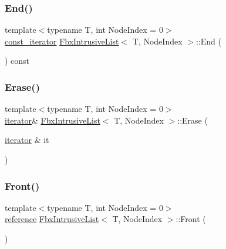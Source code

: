 \mbox{\label{class_fbx_intrusive_list_a0d2ee805c1c4c81b8b2ec06f281bb937}} 
\subsubsection{\texorpdfstring{End()}{End()}\hspace{0.1cm}{\footnotesize\ttfamily [2/2]}}
{\footnotesize\ttfamily template$<$typename T, int Node\+Index = 0$>$ \\
\hyperlink{class_fbx_intrusive_list_a4c0c567c56a712e7ffca9c6bb5990169}{const\+\_\+iterator} \hyperlink{class_fbx_intrusive_list}{Fbx\+Intrusive\+List}$<$ T, Node\+Index $>$\+::End (\begin{DoxyParamCaption}{ }\end{DoxyParamCaption}) const}

\mbox{\label{class_fbx_intrusive_list_a730189544745e9cb520294375d674b5b}} 
\subsubsection{\texorpdfstring{Erase()}{Erase()}}
{\footnotesize\ttfamily template$<$typename T, int Node\+Index = 0$>$ \\
\hyperlink{class_fbx_intrusive_list_ae1012cd86e3ff0a4a49c982f0d34b4e7}{iterator}\& \hyperlink{class_fbx_intrusive_list}{Fbx\+Intrusive\+List}$<$ T, Node\+Index $>$\+::Erase (\begin{DoxyParamCaption}\item[{\hyperlink{class_fbx_intrusive_list_ae1012cd86e3ff0a4a49c982f0d34b4e7}{iterator} \&}]{it }\end{DoxyParamCaption})}

\mbox{\label{class_fbx_intrusive_list_ab7ce2bb2018919a9631c76c2027fbb58}} 
\subsubsection{\texorpdfstring{Front()}{Front()}\hspace{0.1cm}{\footnotesize\ttfamily [1/2]}}
{\footnotesize\ttfamily template$<$typename T, int Node\+Index = 0$>$ \\
\hyperlink{class_fbx_intrusive_list_aa927f048081371fe74dff673d3a5a8ad}{reference} \hyperlink{class_fbx_intrusive_list}{Fbx\+Intrusive\+List}$<$ T, Node\+Index $>$\+::Front (\begin{DoxyParamCaption}{ }\end{DoxyParamCaption})}


